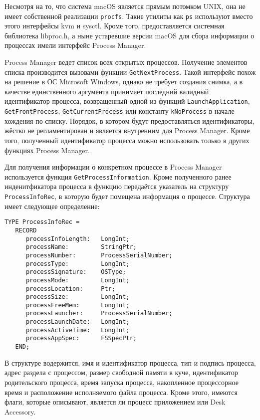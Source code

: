 Несмотря на то, что система macOS является прямым потомком UNIX, она не имеет
собственной реализации \texttt{procfs}. Такие утилиты как \texttt{ps} используют
вместо этого интерфейсы kvm и sysctl\cite{osxproc}. Кроме того, предоставляется
системная библиотека libproc.h, а ныне устаревшие версии macOS для сбора
информации о процессах имели интерфейс Process Manager.

Process Manager ведет список всех открытых процессов\cite{procmanag}. Получение
элементов списка производится вызовами функции \texttt{GetNextProcess}. Такой
интерфейс похож на решение в ОС Microsoft Windows, однако не требует создания
снимка, а в качестве единственного аргумента принимает последний валидный
идентификатор процесса, возвращенный одной из функций %
\texttt{LaunchApplication}, \texttt{GetFrontProcess}, \texttt{GetCurrentProcess}
или константу \texttt{kNoProcess} в начале хождения по списку. Порядок, в
котором будут предоставляться идентификаторы, жёстко не регламентирован и
является внутренним для Process Manager. Кроме того, полученный идентификатор
процесса можно использовать только в других функциях Process Manager.

Для получения информации о конкретном процессе в Process Manager используется
функция \texttt{GetProcessInformation}. Кроме полученного ранее инденитфикатора
процесса в функцию передаётся указатель на структуру \texttt{ProcessInfoRec}, в
которую будет помещена информация о процессе. Структура имеет следующее
определение:

\medskip
\begin{lstlisting}[style=cstyle]
TYPE ProcessInfoRec =
   RECORD
      processInfoLength:   LongInt;
      processName:         StringPtr;
      processNumber:       ProcessSerialNumber;
      processType:         LongInt;
      processSignature:    OSType;
      processMode:         LongInt;
      processLocation:     Ptr;
      processSize:         LongInt;
      processFreeMem:      LongInt;
      processLauncher:     ProcessSerialNumber;
      processLaunchDate:   LongInt;
      processActiveTime:   LongInt;
      processAppSpec:      FSSpecPtr;
   END;
\end{lstlisting}
\medskip

В структуре водержится, имя и идентификатор процесса, тип и подпись процесса,
адрес раздела с процессом, размер свободной памяти в куче, идентификатор
родительского процесса, время запуска процесса, накопленное процессорное время и
расположение исполняемого файла процесса. Кроме этого, имеются флаги, которые
описывают, является ли процесс приложением или Desk Accessory.

